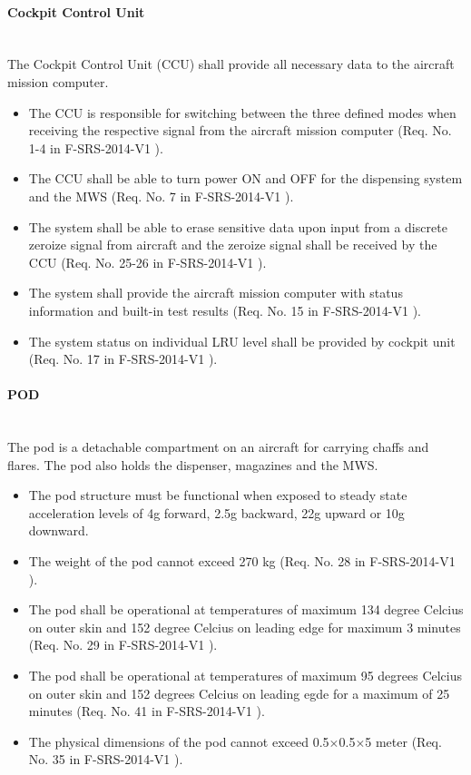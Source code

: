 \paragraph{Cockpit Control Unit}\mbox{}\\
The Cockpit Control Unit (CCU) shall provide all necessary data to the aircraft mission computer.
\begin{itemize}
\item The CCU is responsible for switching between the three defined modes when receiving the respective signal from the aircraft mission computer (Req. No. 1-4 in F-SRS-2014-V1 ).
\item The CCU shall be able to turn power ON and OFF for the dispensing system and the MWS (Req. No. 7 in F-SRS-2014-V1 ).
\item The system shall be able to erase sensitive data upon input from a discrete zeroize signal from aircraft and the zeroize signal shall be received by the CCU (Req. No. 25-26 in F-SRS-2014-V1 ).
\item The system shall provide the aircraft mission computer with status information and built-in test results (Req. No. 15 in F-SRS-2014-V1 ).
\item The system status on individual LRU level shall be provided by cockpit unit (Req. No. 17 in F-SRS-2014-V1 ).
\end{itemize}

\paragraph{POD}\mbox{}\\
The pod is a detachable compartment on an aircraft for carrying chaffs and flares. The pod also holds the dispenser, magazines and the MWS.
\begin{itemize}
\item The pod structure must be functional when exposed to steady state acceleration levels of 4g forward, 2.5g backward, 22g upward or 10g downward.
\item The weight of the pod cannot exceed 270 kg (Req. No. 28 in F-SRS-2014-V1 ).
\item The pod shall be operational at temperatures of maximum 134 degree Celcius on outer skin and 152 degree Celcius on leading edge for maximum 3 minutes (Req. No. 29 in F-SRS-2014-V1 ).
\item The pod shall be operational at temperatures of maximum 95 degrees Celcius on outer skin and 152 degrees Celcius on leading egde for a maximum of 25 minutes (Req. No. 41 in F-SRS-2014-V1 ).
\item The physical dimensions of the pod cannot exceed 0.5$\times$0.5$\times$5 meter (Req. No. 35 in F-SRS-2014-V1 ).
\end{itemize}

